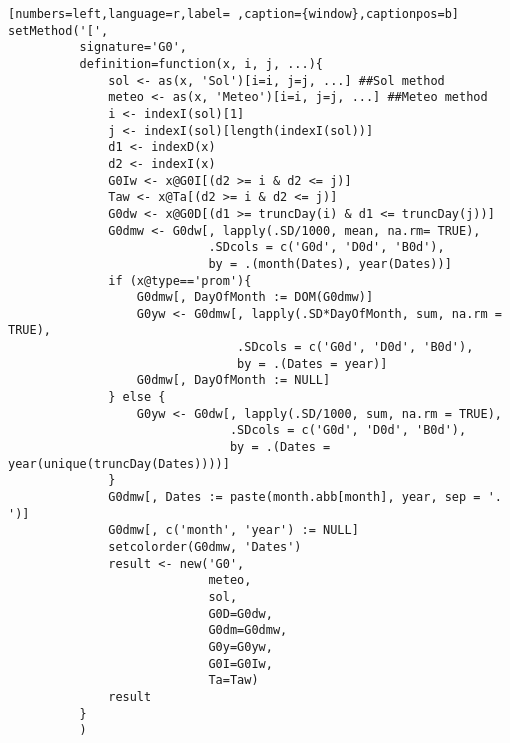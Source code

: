 \begin{lstlisting}[numbers=left,language=r,label= ,caption={window},captionpos=b]
setMethod('[',
          signature='G0',
          definition=function(x, i, j, ...){
              sol <- as(x, 'Sol')[i=i, j=j, ...] ##Sol method
              meteo <- as(x, 'Meteo')[i=i, j=j, ...] ##Meteo method
              i <- indexI(sol)[1]
              j <- indexI(sol)[length(indexI(sol))]
              d1 <- indexD(x)
              d2 <- indexI(x)
              G0Iw <- x@G0I[(d2 >= i & d2 <= j)]
              Taw <- x@Ta[(d2 >= i & d2 <= j)]
              G0dw <- x@G0D[(d1 >= truncDay(i) & d1 <= truncDay(j))]
              G0dmw <- G0dw[, lapply(.SD/1000, mean, na.rm= TRUE),
                            .SDcols = c('G0d', 'D0d', 'B0d'),
                            by = .(month(Dates), year(Dates))]
              if (x@type=='prom'){
                  G0dmw[, DayOfMonth := DOM(G0dmw)]
                  G0yw <- G0dmw[, lapply(.SD*DayOfMonth, sum, na.rm = TRUE),
                                .SDcols = c('G0d', 'D0d', 'B0d'),
                                by = .(Dates = year)]
                  G0dmw[, DayOfMonth := NULL]
              } else {
                  G0yw <- G0dw[, lapply(.SD/1000, sum, na.rm = TRUE),
                               .SDcols = c('G0d', 'D0d', 'B0d'),
                               by = .(Dates = year(unique(truncDay(Dates))))]
              }
              G0dmw[, Dates := paste(month.abb[month], year, sep = '. ')]
              G0dmw[, c('month', 'year') := NULL]
              setcolorder(G0dmw, 'Dates')
              result <- new('G0',
                            meteo,
                            sol,
                            G0D=G0dw,
                            G0dm=G0dmw,
                            G0y=G0yw,
                            G0I=G0Iw,
                            Ta=Taw)
              result
          }
          )



\end{lstlisting}
